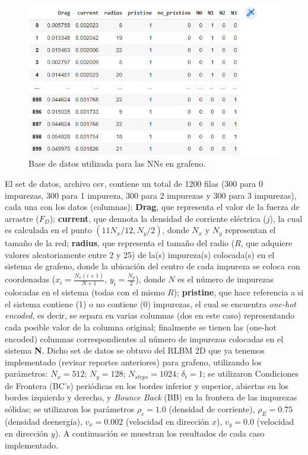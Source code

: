 \documentclass{article}
\begin{document}
\begin{figure}[th!]
\centering
   \includegraphics[width=1.\textwidth]{datos_grafeno.png}
   \caption{Base de datos utilizada para las NNs en grafeno.}
\end{figure}

El set de datos, archivo csv, contiene un total de 1200 filas (300 para 0 impurezas, 300 para 1 impureza, 300 para 2 impurezas y 300 para 3 impurezas), cada una con los datos (columnas): \textbf{Drag}, que representa el valor de la fuerza de arrastre ($F_D$); \textbf{current}, que dennota la densidad de corriente eléctrica ($j$), la cual es calculada en el punto $(11N_x/12, N_y/2)$, donde $N_x$ y $N_y$ representan el tamaño de la red; \textbf{radius}, que representa el tamaño del radio ($R$, que adquiere valores aleatoriamente entre 2 y 25) de la(s) impureza(s) colocada(s) en el sistema de grafeno, donde la ubicación del centro de cada impureza se coloca con coordenadas ($x_i=\frac{N_x(i+1)}{N +1}$, $y_i=\frac{N_y}{2}$), donde $N$ es el número de impurezas colocadas en el sistema (todas con el mismo $R$); \textbf{pristine}, que hace referencia a si el sistema contiene (1) o no contiene (0) impurezas, el cual se encuentra \textit{one-hot encoded}, es decir, se separa en varias columnas (dos en este caso) representando cada posible valor de la columna original; finalmente se tienen las (one-hot encoded) columnas correspondientes al número de impurezas colocadas en el sistema \textbf{N}. Dicho set de datos se obtuvo del RLBM 2D que ya tenemos implementado (revisar reportes anteriores) para grafeno, utilizando los parámetros: $N_x =512$; $N_y=128$; $N_{steps}=1024$; $\delta_t=1$; se utilizaron Condiciones de Frontera (BC's) periódicas en los bordes inferior y superior, abiertas en los bordes izquierdo y derecho, y \textit{Bounce Back} (BB) en la frontera de las impurezas sólidas; se utilizaron los parámetros $\rho_c=1.0$ (densidad de corriente), $\rho_E=0.75$ (densidad deenergía), $v_x=0.002$ (velocidad en dirección $x$), $v_y=0.0$ (velocidad en dirección $y$). A continuación se muestran los resultados de cada caso implementado. 
\end{document}
